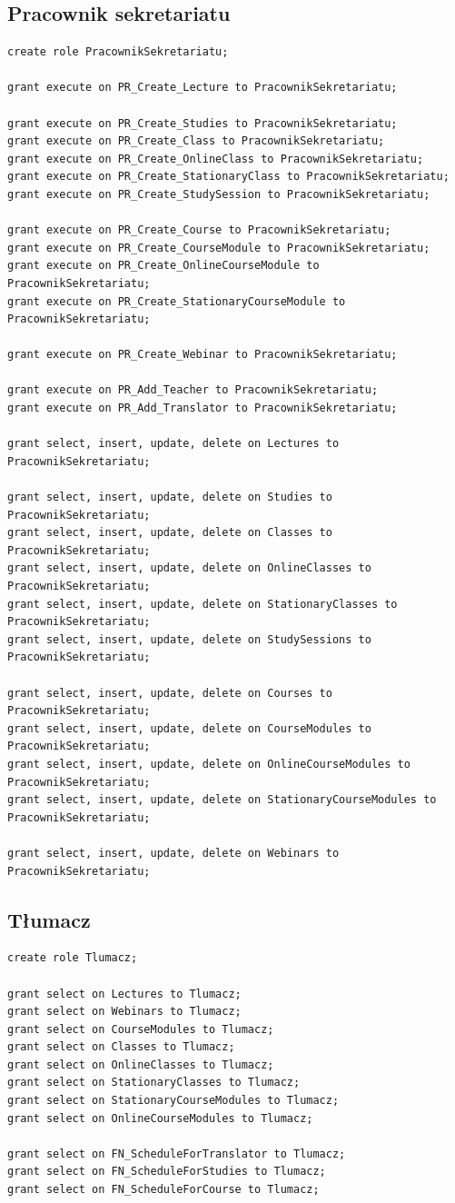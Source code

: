 \documentclass[11pt,a4paper]{article}
\begin{document}
\subsection{Pracownik sekretariatu}
\begin{Verbatim}
create role PracownikSekretariatu;

grant execute on PR_Create_Lecture to PracownikSekretariatu;

grant execute on PR_Create_Studies to PracownikSekretariatu;
grant execute on PR_Create_Class to PracownikSekretariatu;
grant execute on PR_Create_OnlineClass to PracownikSekretariatu;
grant execute on PR_Create_StationaryClass to PracownikSekretariatu;
grant execute on PR_Create_StudySession to PracownikSekretariatu;

grant execute on PR_Create_Course to PracownikSekretariatu;
grant execute on PR_Create_CourseModule to PracownikSekretariatu;
grant execute on PR_Create_OnlineCourseModule to PracownikSekretariatu;
grant execute on PR_Create_StationaryCourseModule to PracownikSekretariatu;

grant execute on PR_Create_Webinar to PracownikSekretariatu;

grant execute on PR_Add_Teacher to PracownikSekretariatu;
grant execute on PR_Add_Translator to PracownikSekretariatu;

grant select, insert, update, delete on Lectures to PracownikSekretariatu;

grant select, insert, update, delete on Studies to PracownikSekretariatu;
grant select, insert, update, delete on Classes to PracownikSekretariatu;
grant select, insert, update, delete on OnlineClasses to PracownikSekretariatu;
grant select, insert, update, delete on StationaryClasses to PracownikSekretariatu;
grant select, insert, update, delete on StudySessions to PracownikSekretariatu;

grant select, insert, update, delete on Courses to PracownikSekretariatu;
grant select, insert, update, delete on CourseModules to PracownikSekretariatu;
grant select, insert, update, delete on OnlineCourseModules to PracownikSekretariatu;
grant select, insert, update, delete on StationaryCourseModules to PracownikSekretariatu;

grant select, insert, update, delete on Webinars to PracownikSekretariatu;
\end{Verbatim}
\subsection{Tłumacz}
\begin{Verbatim}
create role Tlumacz;

grant select on Lectures to Tlumacz;
grant select on Webinars to Tlumacz;
grant select on CourseModules to Tlumacz;
grant select on Classes to Tlumacz;
grant select on OnlineClasses to Tlumacz;
grant select on StationaryClasses to Tlumacz;
grant select on StationaryCourseModules to Tlumacz;
grant select on OnlineCourseModules to Tlumacz;

grant select on FN_ScheduleForTranslator to Tlumacz;
grant select on FN_ScheduleForStudies to Tlumacz;
grant select on FN_ScheduleForCourse to Tlumacz;
\end{Verbatim}
\end{document}
